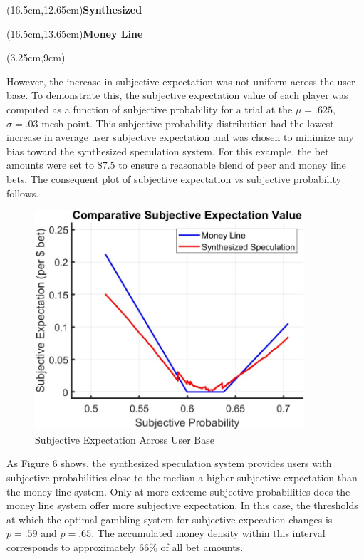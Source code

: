 \documentclass[sn-mathphys-num]{sn-jnl}
\theoremstyle{thmstyleone}%
\theoremstyle{thmstyletwo}%
\theoremstyle{thmstylethree}%
\begin{document}
\begin{textblock*}{7cm}(16.5cm,12.65cm)\textbf{Synthesized} \end{textblock*} 
\begin{textblock*}{7cm}(16.5cm,13.65cm)\textbf{Money Line} \end{textblock*} 
\begin{textblock*}{7cm}(3.25cm,9cm)  \end{textblock*}

However, the increase in subjective expectation was not uniform across the user base. To demonstrate this, the subjective expectation value of each player was computed as a function of subjective probability for a trial at the $\mu = .625$, $\sigma = .03$ mesh point. This subjective probability distribution had the lowest increase in average user subjective expectation and was chosen to minimize any bias toward the synthesized speculation system.  For this example, the bet amounts were set to $\$7.5$ to ensure a reasonable blend of peer and money line bets. The consequent plot of subjective expectation vs subjective probability follows.

\begin{figure}[H]
	\centering
	\includegraphics[width=10cm]{Subjective Expectation Comparison}
	\caption{Subjective Expectation Across User Base}
\end{figure}

As Figure 6 shows, the synthesized speculation system provides users with subjective probabilities close to the median a higher subjective expectation than the money line system. Only at more extreme subjective probabilities does the money line system offer more subjective expectation. In this case, the thresholds at which the optimal gambling system for subjective expecation changes is $p = .59$ and $p = .65$. The accumulated money density within this interval corresponds to approximately $66\%$ of all bet amounts. 
\end{document}
